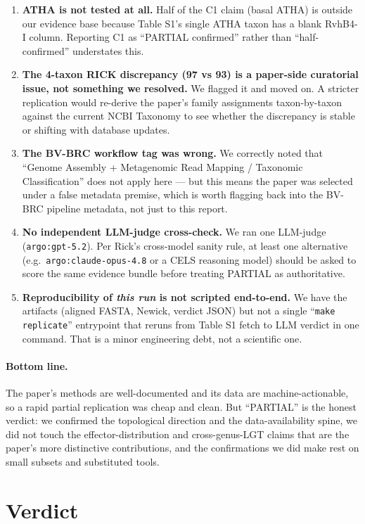\documentclass[11pt,letterpaper]{article}
\begin{document}
\begin{enumerate}[leftmargin=1.6em]
  \item \textbf{ATHA is not tested at all.} Half of the C1 claim (basal ATHA) is
    outside our evidence base because Table S1's single ATHA taxon has a blank RvhB4-I column.
    Reporting C1 as ``PARTIAL confirmed'' rather than ``half-confirmed'' understates this.
  \item \textbf{The 4-taxon RICK discrepancy (97 vs 93) is a paper-side curatorial issue,
    not something we resolved.} We flagged it and moved on. A stricter replication would
    re-derive the paper's family assignments taxon-by-taxon against the current NCBI Taxonomy
    to see whether the discrepancy is stable or shifting with database updates.
  \item \textbf{The BV-BRC workflow tag was wrong.} We correctly noted that
    ``Genome Assembly + Metagenomic Read Mapping / Taxonomic Classification'' does not apply
    here --- but this means the paper was selected under a false metadata premise, which is
    worth flagging back into the BV-BRC pipeline metadata, not just to this report.
  \item \textbf{No independent LLM-judge cross-check.} We ran one LLM-judge (\texttt{argo:gpt-5.2}).
    Per Rick's cross-model sanity rule, at least one alternative (e.g.\ \texttt{argo:claude-opus-4.8}
    or a CELS reasoning model) should be asked to score the same evidence bundle before
    treating PARTIAL as authoritative.
  \item \textbf{Reproducibility of \emph{this run} is not scripted end-to-end.} We have
    the artifacts (aligned FASTA, Newick, verdict JSON) but not a single ``\texttt{make replicate}''
    entrypoint that reruns from Table S1 fetch to LLM verdict in one command. That is a
    minor engineering debt, not a scientific one.
\end{enumerate}

\paragraph{Bottom line.} The paper's methods are well-documented and its data are
machine-actionable, so a rapid partial replication was cheap and clean. But ``PARTIAL''
is the honest verdict: we confirmed the topological direction and the data-availability spine,
we did not touch the effector-distribution and cross-genus-LGT claims that are the paper's
more distinctive contributions, and the confirmations we did make rest on small subsets and
substituted tools.

\section{Verdict}
\end{document}
